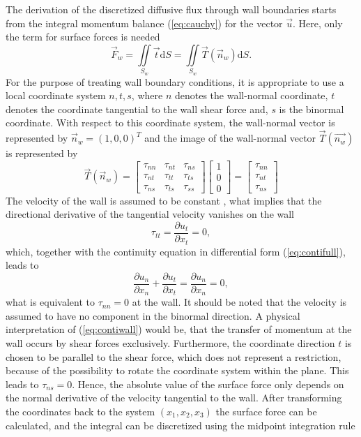 The derivation of the discretized diffusive flux through wall boundaries starts from the integral momentum balance (\ref{eq:cauchy}) for the vector \(\vec{u}\). Here, only the term for surface forces is needed
\begin{displaymath}
  \vec{F}_w =  \iint\limits_{S_w} \vec{t} \mathrm{d}S = \iint\limits_{S_w} \vec{T}(\vec{n}_w) \mathrm{d}S.
\end{displaymath}
For the purpose of treating wall boundary conditions, it is appropriate to use a local coordinate system \(n,t,s\), where \(n\) denotes the wall-normal coordinate, \(t\) denotes the coordinate tangential to the wall shear force and, \(s\) is the binormal coordinate. With respect to this coordinate system, the wall-normal vector is represented by \(\vec{n}_w = \left( 1, 0 , 0 \right)^T\) and the image of the wall-normal vector \(\vec{T}(\vec{n_w})\) is represented by 
\begin{displaymath}
\vec{T}(\vec{n}_w) =
\left[
  \begin{array}{ccc}
    \tau_{nn} & \tau_{nt} & \tau_{ns}\\
    \tau_{nt} & \tau_{tt} & \tau_{ts}\\
    \tau_{ns} & \tau_{ts} & \tau_{ss}
  \end{array}
\right]
\left[
\begin{array}{c}
  1\\
  0\\
  0
\end{array}
\right]
=
\left[
\begin{array}{c}
  \tau_{nn}\\
  \tau_{nt}\\
  \tau_{ns}
\end{array}
\right]
\end{displaymath}
The velocity of the wall is assumed to be constant \cite{schaefer99}, what implies that the directional derivative of the tangential velocity vanishes on the wall
\begin{displaymath}
  \tau_{tt} =  \frac{ \partial u_t }{ \partial x_t }  =  0,
\end{displaymath}
which, together with the continuity equation in differential form (\ref{eq:contifull}), leads to
\begin{equation}
  \label{eq:contiwall}
 \frac{ \partial u_n }{ \partial x_n } + \frac{ \partial u_t }{ \partial x_t } =  \frac{ \partial u_n }{ \partial x_n } = 0,
\end{equation}
what is equivalent to \( \tau_{nn} = 0\) at the wall. It should be noted that the velocity is assumed to have no component in the binormal direction. A physical interpretation of (\ref{eq:contiwall}) would be, that the transfer of momentum at the wall occurs by shear forces exclusively. Furthermore, the coordinate direction \(t\) is chosen to be parallel to the shear force, which does not represent a restriction, because of the possibility to rotate the coordinate system within the plane. This leads to \( \tau_{ns} = 0 \). Hence, the absolute value of the surface force only depends on the normal derivative of the velocity tangential to the wall. After transforming the coordinates back to the system \((x_1, x_2, x_3)\) the surface force can be calculated, and the integral can be discretized using the midpoint integration rule 
